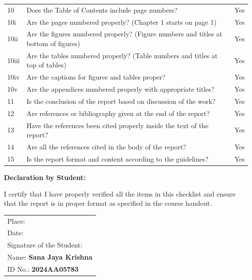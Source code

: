 \documentclass[12pt,a4paper]{article}
\begin{document}
\begin{singlespace}
\begin{longtable}{@{}p{}p{}p{}@{}}
10  & Does the Table of Contents include page numbers?                                                         & Yes \\[4pt]
10i & Are the pages numbered properly? (Chapter 1 starts on page 1)                                           & Yes \\[4pt]
10ii & Are the figures numbered properly? (Figure numbers and titles at bottom of figures)                    & Yes \\[4pt]
10iii & Are the tables numbered properly? (Table numbers and titles at top of tables)                         & Yes \\[4pt]
10iv & Are the captions for figures and tables proper?                                                        & Yes \\[4pt]
10v  & Are the appendices numbered properly with appropriate titles?                                          & Yes \\[4pt]
11  & Is the conclusion of the report based on discussion of the work?                                        & Yes \\[4pt]
12  & Are references or bibliography given at the end of the report?                                          & Yes \\[4pt]
13  & Have the references been cited properly inside the text of the report?                                   & Yes \\[4pt]
14  & Are all the references cited in the body of the report?                                                  & Yes \\[4pt]
15  & Is the report format and content according to the guidelines?                                            & Yes \\[4pt]
\bottomrule
\end{longtable}

\vspace{0.8cm}
\noindent\textbf{Declaration by Student:}

\noindent I certify that I have properly verified all the items in this checklist and ensure that the report is in proper format as specified in the course handout.

\vspace{1.5cm}
\noindent
\begin{tabular}{@{}p{}p{}@{}}
Place: \underline{\hspace{4.5cm}}  & \\[0.5cm]
Date: \underline{\hspace{4.5cm}}   & \\[2cm]
\multicolumn{2}{l}{Signature of the Student: \underline{\hspace{6cm}}} \\[0.5cm]
\multicolumn{2}{l}{Name: \textbf{Sana Jaya Krishna}} \\[0.3cm]
\multicolumn{2}{l}{ID No.: \textbf{2024AA05783}}
\end{tabular}

\end{singlespace}
\end{document}
